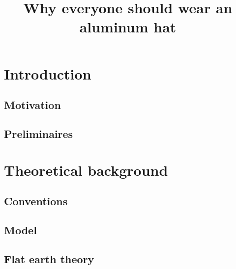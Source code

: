 \documentclass[babel=english]{inetthesis}
\begin{document}
\title{Why everyone should wear an aluminum hat}
\date{}

\maketitle

\begin{abstract}
  \lipsum[1]
\end{abstract}

\tableofcontents

\chapter{Introduction}

\lipsum[2]

\section{Motivation}

\lipsum

\section{Preliminaires}

\lipsum

\chapter{Theoretical background}

\lipsum[2]

\section{Conventions}

\lipsum

\section{Model}

\lipsum

\section{Flat earth theory}
\end{document}
